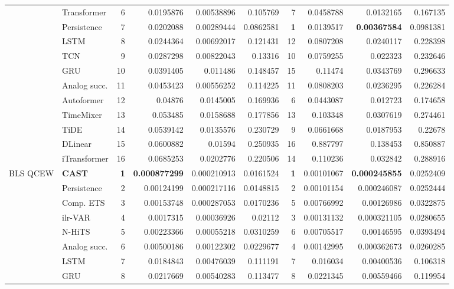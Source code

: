 \begin{longtable}{@{}llrrrrrrrr@{}}
 & Transformer & 6 & 0.0195876 & 0.00538896 & 0.105769 & 7 & 0.0458788 & 0.0132165 & 0.167135 \\
 & Persistence & 7 & 0.0202088 & 0.00289444 & 0.0862581 & \textbf{1} & 0.0139517 & \textbf{0.00367584} & 0.0981381 \\
 & LSTM & 8 & 0.0244364 & 0.00692017 & 0.121431 & 12 & 0.0807208 & 0.0240117 & 0.228398 \\
 & TCN & 9 & 0.0287298 & 0.00822043 & 0.13316 & 10 & 0.0759255 & 0.022323 & 0.232646 \\
 & GRU & 10 & 0.0391405 & 0.011486 & 0.148457 & 15 & 0.11474 & 0.0343769 & 0.296633 \\
 & Analog succ. & 11 & 0.0453423 & 0.00556252 & 0.114225 & 11 & 0.0808203 & 0.0236295 & 0.226284 \\
 & Autoformer & 12 & 0.04876 & 0.0145005 & 0.169936 & 6 & 0.0443087 & 0.012723 & 0.174658 \\
 & TimeMixer & 13 & 0.053485 & 0.0158688 & 0.177856 & 13 & 0.103348 & 0.0307619 & 0.274461 \\
 & TiDE & 14 & 0.0539142 & 0.0135576 & 0.230729 & 9 & 0.0661668 & 0.0187953 & 0.22678 \\
 & DLinear & 15 & 0.0600882 & 0.01594 & 0.250935 & 16 & 0.887797 & 0.138453 & 0.850887 \\
 & iTransformer & 16 & 0.0685253 & 0.0202776 & 0.220506 & 14 & 0.110236 & 0.032842 & 0.288916 \\
\addlinespace
BLS QCEW & \textbf{CAST} & \textbf{1} & \textbf{0.000877299} & 0.000210913 & 0.0161524 & \textbf{1} & 0.00101067 & \textbf{0.000245855} & 0.0252409 \\
 & Persistence & 2 & 0.00124199 & 0.000217116 & 0.0148815 & 2 & 0.00101154 & 0.000246087 & 0.0252444 \\
 & Comp. ETS & 3 & 0.00153748 & 0.000287053 & 0.0170236 & 5 & 0.00766992 & 0.00126986 & 0.0322875 \\
 & ilr-VAR & 4 & 0.0017315 & 0.00036926 & 0.02112 & 3 & 0.00131132 & 0.000321105 & 0.0280655 \\
 & N-HiTS & 5 & 0.00223366 & 0.00055218 & 0.0310259 & 6 & 0.00705517 & 0.00146595 & 0.0393494 \\
 & Analog succ. & 6 & 0.00500186 & 0.00122302 & 0.0229677 & 4 & 0.00142995 & 0.000362673 & 0.0260285 \\
 & LSTM & 7 & 0.0184843 & 0.00476039 & 0.111191 & 7 & 0.016034 & 0.00400536 & 0.106318 \\
 & GRU & 8 & 0.0217669 & 0.00540283 & 0.113477 & 8 & 0.0221345 & 0.00559466 & 0.119954 \\

\end{longtable}
